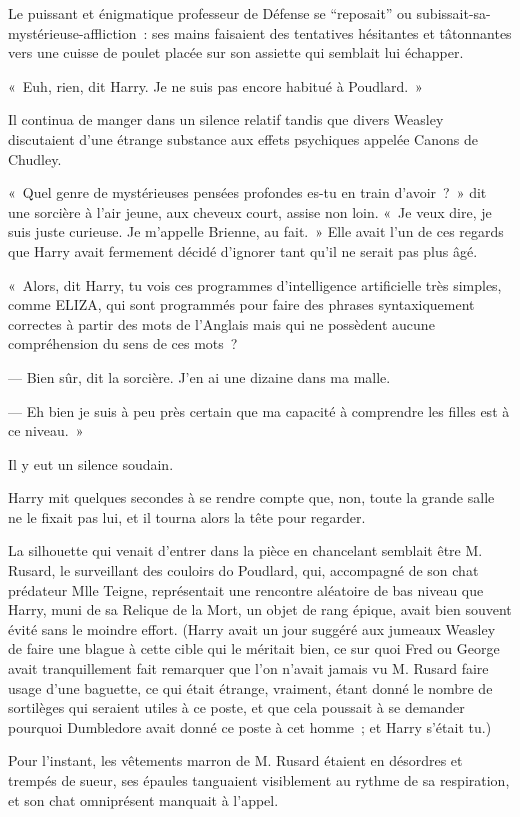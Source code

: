 Le puissant et énigmatique professeur de Défense se “reposait” ou subissait-sa-mystérieuse-affliction~: ses mains faisaient des tentatives hésitantes et tâtonnantes vers une cuisse de poulet placée sur son assiette qui semblait lui échapper.

«~Euh, rien, dit Harry. Je ne suis pas encore habitué à Poudlard.~»

Il continua de manger dans un silence relatif tandis que divers Weasley discutaient d'une étrange substance aux effets psychiques appelée Canons de Chudley.

«~Quel genre de mystérieuses pensées profondes es-tu en train d'avoir~?~» dit une sorcière à l'air jeune, aux cheveux court, assise non loin. «~Je veux dire, je suis juste curieuse. Je m'appelle Brienne, au fait.~» Elle avait l'un de ces regards que Harry avait fermement décidé d'ignorer tant qu'il ne serait pas plus âgé.

«~Alors, dit Harry, tu vois ces programmes d'intelligence artificielle très simples, comme ELIZA, qui sont programmés pour faire des phrases syntaxiquement correctes à partir des mots de l'Anglais mais qui ne possèdent aucune compréhension du sens de ces mots~?

--- Bien sûr, dit la sorcière. J'en ai une dizaine dans ma malle.

--- Eh bien je suis à peu près certain que ma capacité à comprendre les filles est à ce niveau.~»

Il y eut un silence soudain.

Harry mit quelques secondes à se rendre compte que, non, toute la grande salle ne le fixait pas lui, et il tourna alors la tête pour regarder.

La silhouette qui venait d'entrer dans la pièce en chancelant semblait être M. Rusard, le surveillant des couloirs do Poudlard, qui, accompagné de son chat prédateur Mlle Teigne, représentait une rencontre aléatoire de bas niveau que Harry, muni de sa Relique de la Mort, un objet de rang épique, avait bien souvent évité sans le moindre effort. (Harry avait un jour suggéré aux jumeaux Weasley de faire une blague à cette cible qui le méritait bien, ce sur quoi Fred ou George avait tranquillement fait remarquer que l'on n'avait jamais vu M. Rusard faire usage d'une baguette, ce qui était étrange, vraiment, étant donné le nombre de sortilèges qui seraient utiles à ce poste, et que cela poussait à se demander pourquoi Dumbledore avait donné ce poste à cet homme~; et Harry s'était tu.)

Pour l'instant, les vêtements marron de M. Rusard étaient en désordres et trempés de sueur, ses épaules tanguaient visiblement au rythme de sa respiration, et son chat omniprésent manquait à l'appel.

